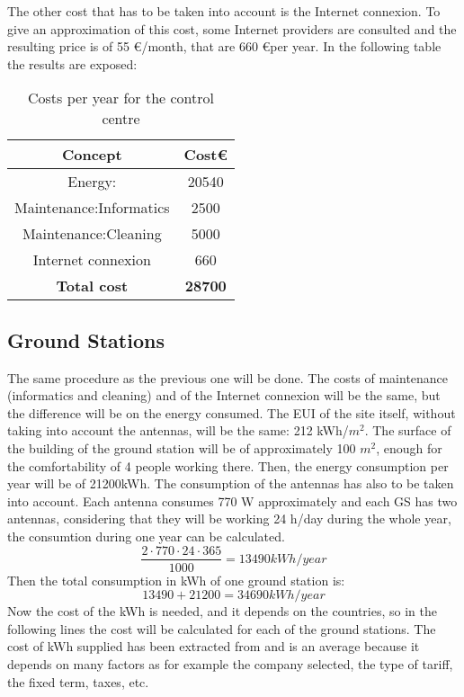 \documentclass[12pt,a4paper]{report}
\begin{document}
The other cost that has to be taken into account is the Internet connexion. To give an approximation of this cost, some Internet providers are consulted and the resulting price is of 55 \euro /month, that are 660 \euro per year.
In the following table the results are exposed:
\begin{table}[H]
\begin{center}
\begin{tabular}{|c|c|}
\hline
\textbf{Concept}&\textbf{Cost\euro}\\
\hline
Energy:&20540\\
\hline
Maintenance:Informatics&2500\\
\hline
Maintenance:Cleaning&5000\\
\hline
Internet connexion&660\\
\hline
\textbf{Total cost}&\textbf{28700}\\
\hline
\end{tabular}
\caption{Costs per year for the control centre}
\end{center}
\end{table}
\subsection{Ground Stations}
The same procedure as the previous one will be done. The costs of maintenance (informatics and cleaning) and of the Internet connexion will be the same, but the difference will be on the energy consumed. The EUI of the site itself, without taking into account the antennas, will be the same: 212 kWh/$m^2$. The surface of the building of the ground station will be of approximately 100 $m^2$, enough for the comfortability of 4 people working there. Then, the energy consumption per year will be of 21200kWh. The consumption of the antennas has also to be taken into account. Each antenna consumes 770 W approximately and each GS has two antennas, considering that they will be working 24 h/day during the whole year, the consumtion during one year can be calculated.
\begin{equation}
\frac{2 \cdot 770 \cdot 24 \cdot 365}{1000}=13490 kWh/year 
\end{equation}
Then the total consumption in kWh of one ground station is:
\begin{equation}
13490+21200=34690kWh/year
\end{equation}
Now the cost of the kWh is needed, and it depends on the countries, so in the following lines the cost will be calculated for each of the ground stations. The cost of kWh supplied has been extracted from \cite{OVO} and is an average because it depends on many factors as for example the company selected, the type of tariff, the fixed term, taxes, etc. 
\end{document}
